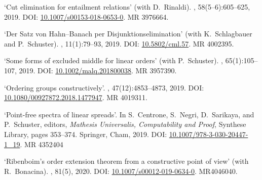 \documentclass[a4paper]{article}
\begin{document}
\begin{flushleft}
\begin{thebibliography}{10}

\newblock `Cut elimination for entailment relations' (with D.~Rinaldi).
, 58(5--6):605--625, 2019.
\newblock DOI: \href{https://doi.org/10.1007/s00153-018-0653-0}{10.1007/s00153-018-0653-0}.
\newblock MR 3976664.

\newblock `Der {S}atz von {Hahn--Banach} per {D}isjunktionselimination' (with K.~Schlagbauer and P.~Schuster).
, 11(1):79--93, 2019.
\newblock DOI: \href{https://doi.org/10.5802/cml.57}{10.5802/cml.57}.
\newblock MR 4002395.

\newblock `Some forms of excluded middle for linear orders' (with P.~Schuster).
, 65(1):105--107, 2019.
\newblock DOI: \href{https://doi.org/10.1002/malq.201800038}{10.1002/malq.201800038}.
\newblock MR 3957390.

\newblock `Ordering groups constructively'.
, 47(12):4853--4873, 2019.
\newblock DOI: \href{https://doi.org/10.1080/00927872.2018.1477947}{10.1080/00927872.2018.1477947}.
\newblock MR 4019311.

\newblock `Point-free spectra of linear spreads'.
\newblock In S.~Centrone, S.~Negri, D.~Sarikaya, and P.~Schuster, editors, {\em
  {M}athesis {U}niversalis, {C}omputability and {P}roof}, {S}ynthese {L}ibrary,
  pages 353--374. Springer, Cham, 2019.
\newblock DOI: \href{https://doi.org/10.1007/978-3-030-20447-1_19}{10.1007/978-3-030-20447-1\_19}.
\newblock MR 4352404

\newblock `Ribenboim's order extension theorem from a constructive point of view' (with R.~Bonacina).
, 81(5), 2020.
\newblock DOI: \href{https://doi.org/10.1007/s00012-019-0634-0}{10.1007/s00012-019-0634-0}.
\newblock MR4046040.


\end{thebibliography}
\end{flushleft}
\end{document}
